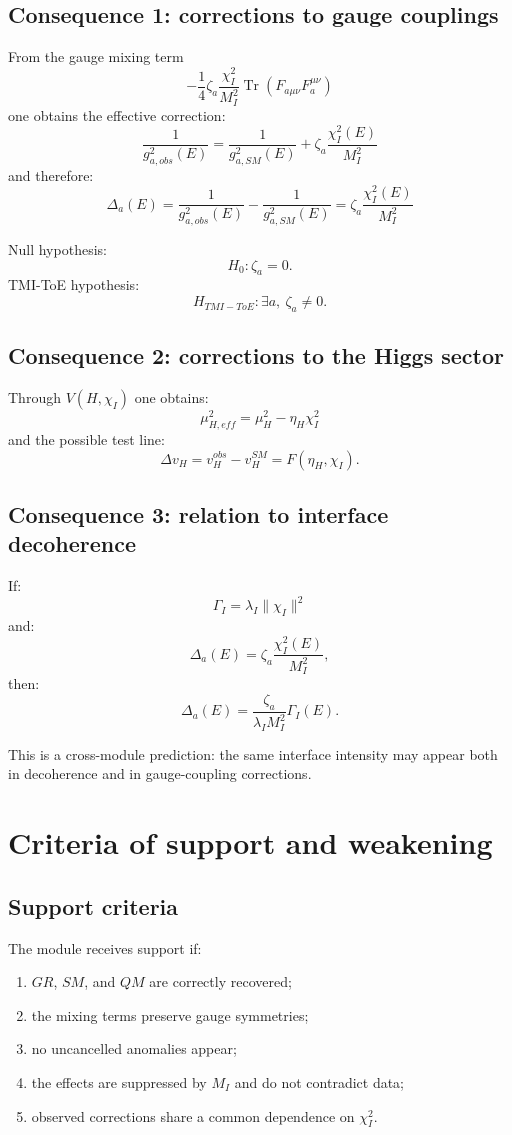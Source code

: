 \documentclass[12pt,a4paper]{article}
\DeclareMathOperator{\Tr}{Tr}
\begin{document}
\subsection{Consequence 1: corrections to gauge couplings}

From the gauge mixing term
\[
-\frac14\zeta_a\frac{\chi_I^2}{M_I^2}\Tr(F_{a\mu\nu}F_a^{\mu\nu})
\]
one obtains the effective correction:
\[
\boxed{
\frac{1}{g_{a,obs}^2(E)}=
\frac{1}{g_{a,SM}^2(E)}+
\zeta_a\frac{\chi_I^2(E)}{M_I^2}
}
\]
and therefore:
\[
\boxed{
\Delta_a(E)=
\frac{1}{g_{a,obs}^2(E)}-
\frac{1}{g_{a,SM}^2(E)}=
\zeta_a\frac{\chi_I^2(E)}{M_I^2}
}
\]

Null hypothesis:
\[
\boxed{H_0:\zeta_a=0}.
\]
TMI-ToE hypothesis:
\[
\boxed{H_{TMI-ToE}:\exists a,\ \zeta_a\neq0}.
\]

\subsection{Consequence 2: corrections to the Higgs sector}

Through $V(H,\chi_I)$ one obtains:
\[
\boxed{\mu_{H,eff}^2=\mu_H^2-\eta_H\chi_I^2}
\]
and the possible test line:
\[
\boxed{\Delta v_H=v_H^{obs}-v_H^{SM}=F(\eta_H,\chi_I)}.
\]

\subsection{Consequence 3: relation to interface decoherence}

If:
\[
\Gamma_I=\lambda_I\|\chi_I\|^2
\]
and:
\[
\Delta_a(E)=\zeta_a\frac{\chi_I^2(E)}{M_I^2},
\]
then:
\[
\boxed{\Delta_a(E)=\frac{\zeta_a}{\lambda_I M_I^2}\Gamma_I(E)}.
\]

This is a cross-module prediction: the same interface intensity may appear both in decoherence and in gauge-coupling corrections.

\section{Criteria of support and weakening}

\subsection{Support criteria}

The module receives support if:
\begin{enumerate}
  \item $GR$, $SM$, and $QM$ are correctly recovered;
  \item the mixing terms preserve gauge symmetries;
  \item no uncancelled anomalies appear;
  \item the effects are suppressed by $M_I$ and do not contradict data;
  \item observed corrections share a common dependence on $\chi_I^2$.
\end{enumerate}
\end{document}
